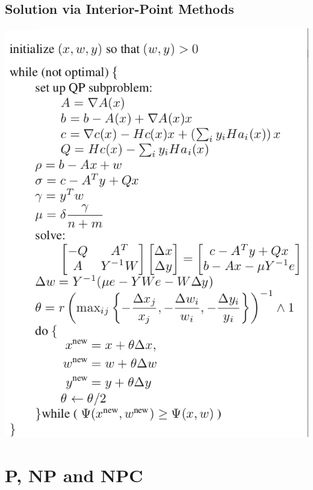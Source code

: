 \documentclass[11pt]{article}
\begin{document}
\subsection{Solution via Interior-Point Methods}
\label{sec:orgd488b0b}
\begin{center}
\includegraphics[width=.9\linewidth]{Convex Programming/screenshot_2019-03-17_16-33-17.png}
\end{center}
\section{P, NP and NPC}
\label{sec:org1c9b5c3}
\end{document}
